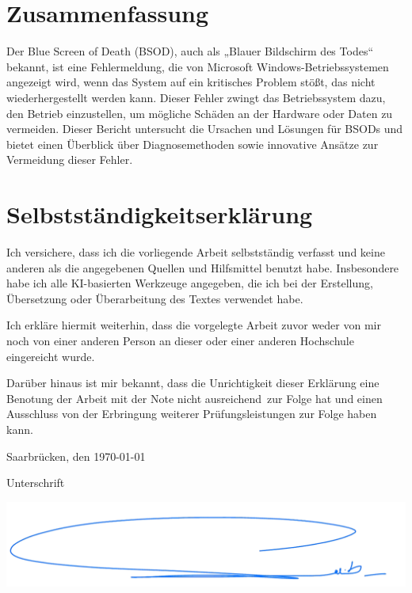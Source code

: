 \documentclass[paper=a4,fontsize=12pt,ngerman,parskip=half]{scrartcl}
\begin{document}
\newcommand{\rectangle}{\rule{0.5em}{0.5em}}

\pagestyle{plain}



\section*{Zusammenfassung}
Der Blue Screen of Death (BSOD), auch als „Blauer Bildschirm des Todes“ bekannt, ist eine Fehlermeldung, die von Microsoft Windows-Betriebssystemen angezeigt wird, wenn das System auf ein kritisches Problem stößt, das nicht wiederhergestellt werden kann. Dieser Fehler zwingt das Betriebssystem dazu, den Betrieb einzustellen, um mögliche Schäden an der Hardware oder Daten zu vermeiden. Dieser Bericht untersucht die Ursachen und Lösungen für BSODs und bietet einen Überblick über Diagnosemethoden sowie innovative Ansätze zur Vermeidung dieser Fehler.\cite{ChatGPT}


\newpage
\section*{Selbstständigkeitserklärung}
Ich versichere, dass ich die vorliegende Arbeit selbstständig verfasst und
keine anderen als die angegebenen Quellen und Hilfsmittel benutzt habe.
Insbesondere habe ich alle KI-basierten Werkzeuge angegeben, die ich bei
der Erstellung, Übersetzung oder Überarbeitung des Textes verwendet habe.

Ich erkläre hiermit weiterhin, dass die vorgelegte Arbeit zuvor weder von mir
noch von einer anderen Person an dieser oder einer anderen Hochschule
eingereicht wurde.

Darüber hinaus ist mir bekannt, dass die Unrichtigkeit dieser Erklärung eine
Benotung der Arbeit mit der Note \glqq nicht ausreichend\grqq \ zur Folge hat
und einen Ausschluss von der Erbringung weiterer Prüfungsleistungen zur Folge
haben kann.
\bigskip

Saarbrücken, den \today

\smallskip
Unterschrift\cite{Remove}

\includegraphics*[scale = 0.2]{graphics/Unterschrift/WhatsApp_Image_2024-08-22_at_17.04.18-removebg-preview.png}
\end{document}
